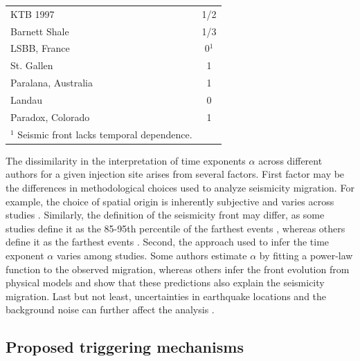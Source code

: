 \documentclass[draft]{agujournal2019}
\begin{document}
\begin{table}[htbp]
\begin{tabular}{llc}
		\midrule
		KTB 1997                          & \cite{ShapiroEtAl1997}   & 1/2                     \\
		Barnett Shale                     & \cite{ShapiroDinske2009} & 1/3                     \\
		LSBB, France                      & \cite{DuboeufEtAl2017}   & 0$^1$                   \\
		St. Gallen                        & \cite{GoebelBrodsky2018} & 1                       \\
		Paralana, Australia               & \cite{GoebelBrodsky2018} & 1                       \\
		Landau                            & \cite{GoebelBrodsky2018} & 0                       \\
		Paradox, Colorado                 & \cite{GoebelBrodsky2018} & 1                       \\
		\bottomrule
		\multicolumn{2}{l}{$^1$ Seismic front lacks temporal dependence.}
	\end{tabular}
\end{table}

The dissimilarity in the interpretation of time exponents $\alpha$ across different authors for a given injection site arises from several factors. First factor may be the differences in methodological choices used to analyze seismicity migration. For example, the choice of spatial origin is inherently subjective and varies across studies \cite{DeBarrosEtAl2021}.
Similarly, the definition of the seismicity front may differ, as some studies define it as the 85-95th percentile of the farthest events \cite{DanreEtAl2024}, whereas others define it as the farthest events \cite{JohannEtAl2016}.
Second, the approach used to infer the time exponent $\alpha$ varies among studies.
Some authors \cite{JohannEtAl2016, DeBarrosEtAl2021, GoebelBrodsky2018} estimate $\alpha$ by fitting a power-law function to the observed migration, whereas others \cite{ShapiroEtAl2002, LenglineEtAl2017, SaezUribe2023, DanreEtAl2024} infer the front evolution from physical models and show that these predictions also explain the seismicity migration.
Last but not least, uncertainties in earthquake locations and the background noise can further affect the analysis .

\subsection{Proposed triggering mechanisms}
\end{document}
